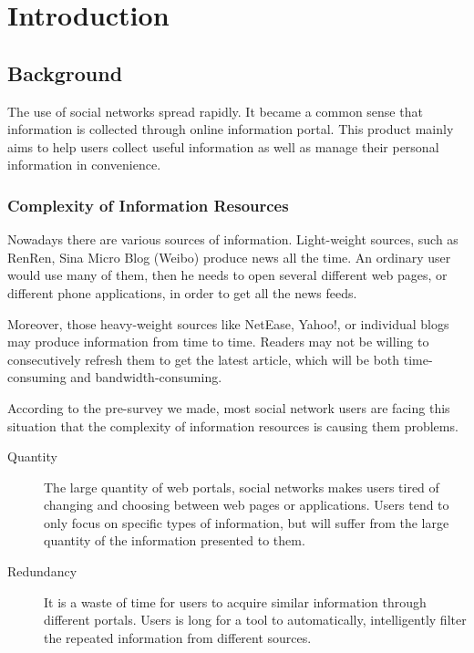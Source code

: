 
\section{Introduction}
\subsection{Background}
The use of social networks spread rapidly.
It became a common sense that information is collected through online information portal.
This product mainly aims to help users collect useful information
as well as manage their personal information in convenience.

\subsubsection{Complexity of Information Resources}

    Nowadays there are various sources of information.
    Light-weight sources, such as RenRen, Sina Micro Blog (Weibo) produce
    news all the time. An ordinary user would use many of them,
    then he needs to open several different web pages, or different phone applications,
    in order to get all the news feeds.

    Moreover, those heavy-weight sources like NetEase, Yahoo!,
    or individual blogs may produce information from time to time.
    Readers may not be willing to consecutively refresh them to get the latest article,
    which will be both time-consuming and bandwidth-consuming.

    According to the pre-survey we made,
    most social network users are facing this situation that the complexity
    of information resources is causing them problems.

\begin{description}
  \item[Quantity] \hfill

    The large quantity of web portals,
    social networks makes users tired of changing and choosing between web pages or applications.
    Users tend to only focus on specific types of information, but will suffer from the large quantity of
    the information presented to them.

  \item[Redundancy] \hfill

   It is a waste of time for users to acquire similar information through different portals.
   Users is long for a tool to automatically, intelligently filter the repeated information from different
   sources.

\end{description}


